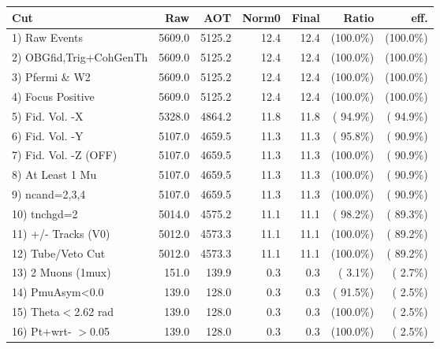  \begin{table}[h!]\centering
 \begin{tabular}{||l||r|r|r|r|r|r||}
 \hline
 \hline
 Cut & Raw & AOT & Norm0 & Final & Ratio & eff.       \\
 \hline
  1) Raw Events           &       5609.0 &       5125.2 &         12.4 &         12.4 & (100.0\%) & (100.0\%) \\
  2) OBGfid,Trig+CohGenTh &       5609.0 &       5125.2 &         12.4 &         12.4 & (100.0\%) & (100.0\%) \\
  3) Pfermi \& W2         &       5609.0 &       5125.2 &         12.4 &         12.4 & (100.0\%) & (100.0\%) \\
  4) Focus Positive       &       5609.0 &       5125.2 &         12.4 &         12.4 & (100.0\%) & (100.0\%) \\
  5) Fid. Vol. -X         &       5328.0 &       4864.2 &         11.8 &         11.8 & ( 94.9\%) & ( 94.9\%) \\
  6) Fid. Vol. -Y         &       5107.0 &       4659.5 &         11.3 &         11.3 & ( 95.8\%) & ( 90.9\%) \\
  7) Fid. Vol. -Z (OFF)   &       5107.0 &       4659.5 &         11.3 &         11.3 & (100.0\%) & ( 90.9\%) \\
  8) At Least 1 Mu        &       5107.0 &       4659.5 &         11.3 &         11.3 & (100.0\%) & ( 90.9\%) \\
  9) ncand=2,3,4          &       5107.0 &       4659.5 &         11.3 &         11.3 & (100.0\%) & ( 90.9\%) \\
 10) tnchgd=2             &       5014.0 &       4575.2 &         11.1 &         11.1 & ( 98.2\%) & ( 89.3\%) \\
 11) +/- Tracks (V0)      &       5012.0 &       4573.3 &         11.1 &         11.1 & (100.0\%) & ( 89.2\%) \\
 12) Tube/Veto Cut        &       5012.0 &       4573.3 &         11.1 &         11.1 & (100.0\%) & ( 89.2\%) \\
 13) 2 Muons (1mux)       &        151.0 &        139.9 &          0.3 &          0.3 & (  3.1\%) & (  2.7\%) \\
 14) PmuAsym<0.0          &        139.0 &        128.0 &          0.3 &          0.3 & ( 91.5\%) & (  2.5\%) \\
 15) Theta$<$2.62 rad     &        139.0 &        128.0 &          0.3 &          0.3 & (100.0\%) & (  2.5\%) \\
 16) Pt+wrt- $>$0.05      &        139.0 &        128.0 &          0.3 &          0.3 & (100.0\%) & (  2.5\%) \\

\end{tabular}
\end{table}
